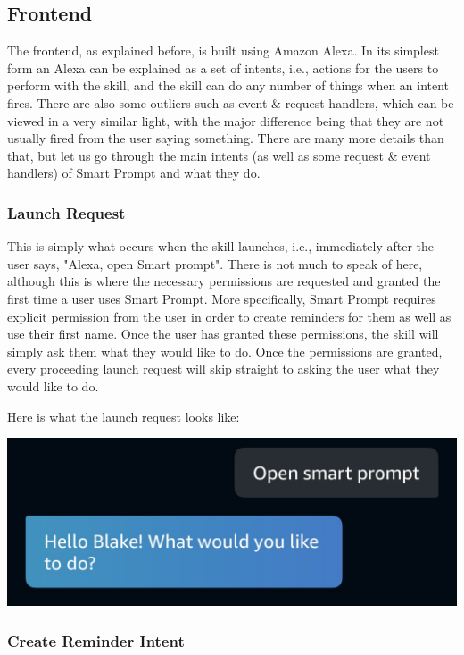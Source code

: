 \documentclass[11pt, oneside]{article}
\begin{document}
\subsection{Frontend}

The frontend, as explained before, is built using Amazon Alexa. 
In its simplest form an Alexa can be explained as a set of intents, i.e., actions for the users to perform with the skill, and the skill can do any number of things when an intent fires. 
There are also some outliers such as event \& request handlers, which can be viewed in a very similar light, with the major difference being that they are not usually fired from the user saying something. 
There are many more details than that, but let us go through the main intents (as well as some request \& event handlers) of Smart Prompt and what they do. 

\subsubsection{Launch Request}

This is simply what occurs when the skill launches, i.e., immediately after the user says, "Alexa, open Smart prompt". 
There is not much to speak of here, although this is where the necessary permissions are requested and granted the first time a user uses Smart Prompt. 
More specifically, Smart Prompt requires explicit permission from the user in order to create reminders for them as well as use their first name. 
Once the user has granted these permissions, the skill will simply ask them what they would like to do. 
Once the permissions are granted, every proceeding launch request will skip straight to asking the user what they would like to do. 

Here is what the launch request looks like:
\begin{center}
  \includegraphics[width=\linewidth * 3/4]{images/launchRequest.jpg}
\end{center}

\subsubsection{Create Reminder Intent}
\end{document}
